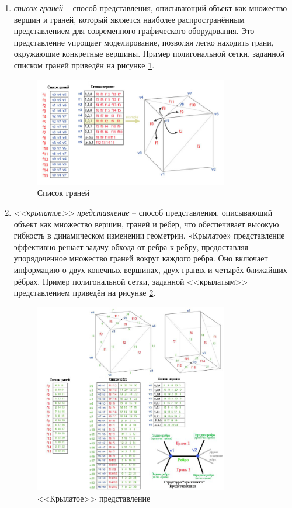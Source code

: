 \begin{enumerate}
	\item \textit{список граней} -- способ представления, описывающий объект как множество вершин и граней, который является наиболее распространённым представлением для современного графического оборудования. Это представление упрощает моделирование, позволяя легко находить грани, окружающие конкретные вершины. Пример полигональной сетки, заданной списком граней приведён на рисунке \ref{fig:planes-list}. 
	\begin{figure}[h] 
		\centering
		\includegraphics[width=0.8\textwidth]{images/planes-list.png}
		\caption{Список граней} 
		\label{fig:planes-list} 
	\end{figure}
	
	\item \textit{<<крылатое>> представление} -- способ представления, описывающий объект как множество вершин, граней и рёбер, что обеспечивает высокую гибкость в динамическом изменении геометрии. «Крылатое» представление эффективно решает задачу обхода от ребра к ребру, предоставляя упорядоченное множество граней вокруг каждого ребра. Оно включает информацию о двух конечных вершинах, двух гранях и четырёх ближайших рёбрах. Пример полигональной сетки, заданной <<крылатым>> представлением приведён на рисунке \ref{fig:wings-list}. 
	\begin{figure}[h] 
		\centering
		\includegraphics[width=0.8\textwidth]{images/wings-list.png}
		\caption{<<Крылатое>> представление} 
		\label{fig:wings-list} 
	\end{figure}
\end{enumerate}

